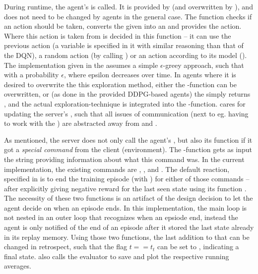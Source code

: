 During runtime, the agent's  is called. It is provided by  (and overwritten by ), and does not need to be changed by agents in the general case. The function checks if an action should be taken, converts the given  into an  and provides the action. Where this action is taken from is decided in this function -- it can use the previous action (a variable  is specified in it with similar reasoning than that of the DQN\cite{mnih_human-level_2015}), a random action (by calling ) or an action according to its model (). The implementation given in the  assumes a simple $\epsilon$-greey approach, such that  with a probability $\epsilon$, where epsilon decreases over time. In agents where it is desired to overwrite the this exploration method, either the -function can be overwritten, or (as done in the provided DDPG-based agents) the  simply returns , and the actual exploration-technique is integrated into the -function. 
 cares for updating the server's , such that all issues of communication (next to eg. having to work with the ) are abstracted away from  and . 

As mentioned, the server does not only call the agent's , but also its function  if it got a \textit{special command} from the client (environment). The -function gets as input the string providing information about what this command was. In the current implementation, the existing commands are , ,  and  . The default reaction, specified in  is to end the training episode (with ) for either of those commands -- after explicitly giving negative reward for the last seen state using its function . The necessity of these two functions is an artifact of the design decision to let the agent decide on when an episode ends. In this implementation, the main loop is not nested in an outer loop that recognizes when an epsiode end, instead the agent is only notified of the end of an episode after it stored the last state already in its replay memory. Using those two functions, the last addition to that can be changed in retrospect, such that the flag $t == t_t$ can be set to , indicating a final state.  also calls the evaluator to save and plot the respective running averages.

